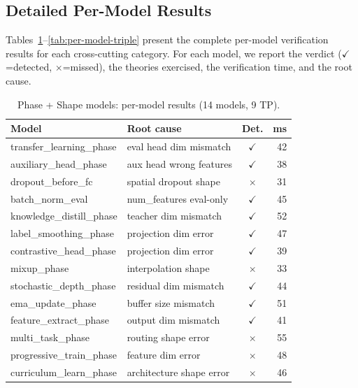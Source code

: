 \documentclass[10pt]{article}
\theoremstyle{plain}
\theoremstyle{definition}
\theoremstyle{remark}
\begin{document}
\subsection{Detailed Per-Model Results}\label{sec:per-model}

Tables~\ref{tab:per-model-phase}--\ref{tab:per-model-triple} present
the complete per-model verification results for each cross-cutting
category.  For each model, we report the verdict
($\checkmark$=detected, $\times$=missed), the theories exercised,
the verification time, and the root cause.

\begin{table}[t]
\centering
\caption{Phase + Shape models: per-model results (14 models, 9 TP).}
\label{tab:per-model-phase}
\small
\begin{tabular}{@{}llcr@{}}
\toprule
\textbf{Model} & \textbf{Root cause} & \textbf{Det.} & \textbf{ms} \\
\midrule
transfer\_learning\_phase    & eval head dim mismatch    & $\checkmark$ & 42 \\
auxiliary\_head\_phase       & aux head wrong features   & $\checkmark$ & 38 \\
dropout\_before\_fc          & spatial dropout shape     & $\times$     & 31 \\
batch\_norm\_eval            & num\_features eval-only   & $\checkmark$ & 45 \\
knowledge\_distill\_phase    & teacher dim mismatch      & $\checkmark$ & 52 \\
label\_smoothing\_phase      & projection dim error      & $\checkmark$ & 47 \\
contrastive\_head\_phase     & projection dim error      & $\checkmark$ & 39 \\
mixup\_phase                 & interpolation shape       & $\times$     & 33 \\
stochastic\_depth\_phase     & residual dim mismatch     & $\checkmark$ & 44 \\
ema\_update\_phase           & buffer size mismatch      & $\checkmark$ & 51 \\
feature\_extract\_phase      & output dim mismatch       & $\checkmark$ & 41 \\
multi\_task\_phase           & routing shape error       & $\times$     & 55 \\
progressive\_train\_phase    & feature dim error         & $\times$     & 48 \\
curriculum\_learn\_phase     & architecture shape error  & $\times$     & 46 \\
\bottomrule
\end{tabular}
\end{table}
\end{document}

